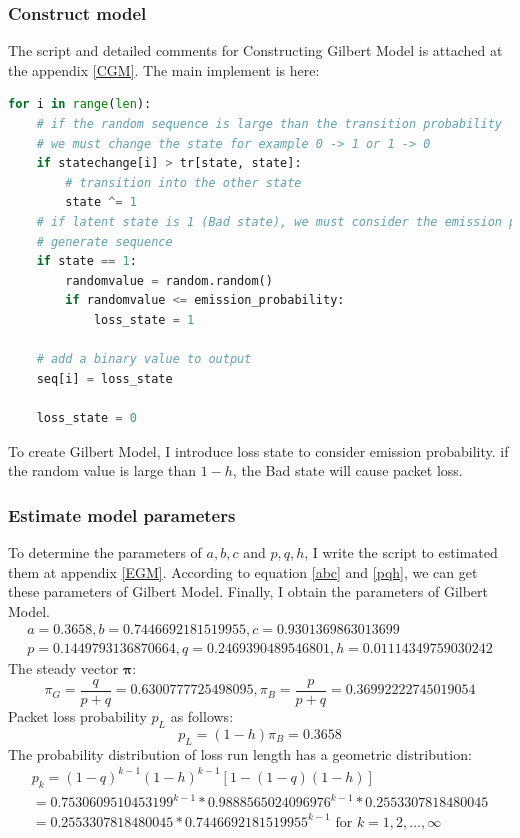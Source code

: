 \documentclass[11pt]{article}
\begin{document}
\subsubsection{Construct model}
The script and detailed comments for Constructing Gilbert Model is attached at the appendix \ref{CGM}.  The main implement is here:
\begin{lstlisting}[language=Python]
for i in range(len):
    # if the random sequence is large than the transition probability
    # we must change the state for example 0 -> 1 or 1 -> 0
    if statechange[i] > tr[state, state]:
        # transition into the other state
        state ^= 1
    # if latent state is 1 (Bad state), we must consider the emission probability to
    # generate sequence
    if state == 1:
        randomvalue = random.random()
        if randomvalue <= emission_probability:
            loss_state = 1

    # add a binary value to output
    seq[i] = loss_state

    loss_state = 0
\end{lstlisting}
To create Gilbert Model, I introduce loss state to consider emission probability. if the random value is large than $1-h$, the Bad state will cause packet loss.
\subsubsection{Estimate model parameters}
To determine the parameters of $a,b,c$ and $p,q,h$, I write the script to estimated them at appendix \ref{EGM}.
According to equation \ref{abc} and \ref{pqh}, we can get these parameters of Gilbert Model.
Finally, I obtain the parameters of Gilbert Model.
\begin{equation}
    \begin{array}{lr}
        a=0.3658,
        b=0.7446692181519955,
        c=0.9301369863013699\\
        p=0.1449793136870664,
        q=0.2469390489546801,
        h=0.01114349759030242
    \end{array}
\end{equation}
The steady vector $\boldsymbol{\pi}$:
\begin{equation}
    \pi_G = \frac{q}{p+q} = 0.6300777725498095, \pi_B = \frac{p}{p+q} = 0.36992222745019054
\end{equation}
Packet loss probability $p_L$ as follows:
\begin{equation}
    p_L = (1-h)\pi_B = 0.3658
\end{equation}
The probability distribution of loss run length has a geometric distribution:
\begin{equation}
    \begin{array}{lr}
        p_{k} =(1-q)^{k-1}(1-h)^{k-1}[1-(1-q)(1-h)] 
        \\=0.7530609510453199 ^{k-1}*0.9888565024096976^{k-1}*0.2553307818480045
        \\= 0.2553307818480045 * 0.7446692181519955^{k-1}
        \text { for } k=1,2, \ldots, \infty \label{distributionofGM}
    \end{array}
\end{equation}
\end{document}
